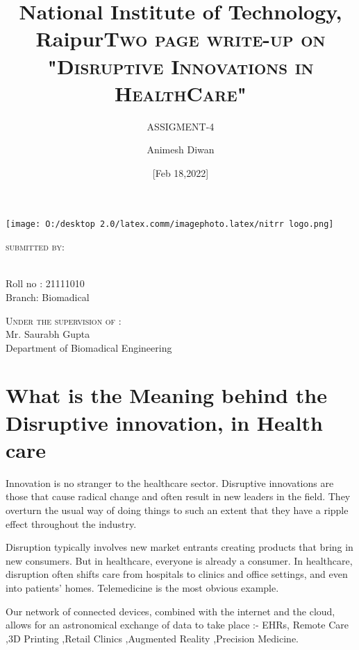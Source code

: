 \documentclass[12pt]{article}
\begin{document}
\title{National Institute of Technology, Raipur}



\author{ASSIGMENT-4}


\date{[Feb 18,2022]}





\maketitle
\centering
\title{\textsc{\large    Two page write-up on "Disruptive Innovations in HealthCare"} }


\texttt{[image: O:/desktop 2.0/latex.comm/imagephoto.latex/nitrr logo.png]}



\centering

\begin{flushleft}	
\textsc{\large submitted by:}\\   
\author{Animesh Diwan}\\
[0.2cm]
Roll no : 21111010\\
[0.2cm]
Branch: Biomadical\\
[0.4cm]
\end{flushleft}       
\begin{flushright}
\textsc{\large Under the supervision of :}\\
Mr. Saurabh Gupta \\
Department of Biomadical Engineering\\
\end{flushright}


\newpage


\tableofcontents

\pagebreak 

\section{ 
 \textbf{\large What is the Meaning behind the Disruptive  innovation, in Health care } }

\begin{flushleft}


Innovation is no stranger to the healthcare sector.  Disruptive innovations are those that cause radical change and often result in new leaders in the field. They overturn the usual way of doing things to such an extent that they have a ripple effect throughout the industry.

Disruption typically involves new market entrants creating products that bring in new consumers. But in healthcare, everyone is already a consumer. In healthcare, disruption often shifts care from hospitals to clinics and office settings, and even into patients' homes. Telemedicine is the most obvious example.

Our network of connected devices, combined with the internet and the cloud, allows for an astronomical exchange of data to take place :- EHRs, Remote Care ,3D Printing ,Retail Clinics ,Augmented Reality ,Precision Medicine.

\end{flushleft}
\end{document}
